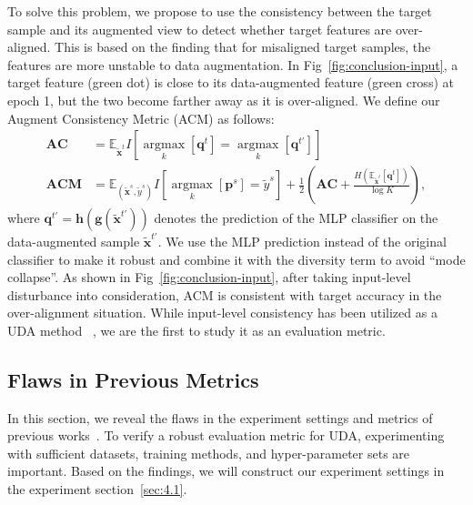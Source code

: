\documentclass{article} %
\begin{document}
To solve this problem, we propose to use the consistency between the target sample and its augmented view to detect whether target features are over-aligned. This is based on the finding that for misaligned target samples, the features are more unstable to data augmentation. In Fig~\ref{fig:conclusion-input}, a target feature (green dot) is close to its data-augmented feature (green cross) at epoch 1, but the two become farther away as it is over-aligned. We define our Augment Consistency Metric (ACM) as follows:
\begin{align}
    \boldsymbol{AC}
	&= \mathbb{E}_{\tilde{\boldsymbol{x}}^t} I[\underset{k}{\operatorname{argmax}}[\boldsymbol{q}^t]= \underset{k}{\operatorname{argmax}}[\boldsymbol{q}^{t \prime}]] \\
	\boldsymbol{ACM} &= \mathbb{E}_{(\tilde{\boldsymbol{x}}^s,\tilde y^s)} I[\underset{k}{\operatorname{argmax}}[\boldsymbol{p}^s] = \tilde y^s]+\frac{1}{2}(\boldsymbol{AC} + \frac{H(\mathbb{E}_{\tilde{\boldsymbol{x}}^t}[\boldsymbol{q}^t])}{\log K}),
\end{align}
where $\boldsymbol{q}^{t \prime}=\textbf{h}(\textbf{g}(\tilde{\boldsymbol{x}}^{t \prime}))$ denotes the prediction of the MLP classifier on the data-augmented sample $\tilde{\boldsymbol{x}}^{t \prime}$. We use the MLP prediction instead of the original classifier to make it robust and combine it with the diversity term to avoid ``mode collapse''. As shown in Fig~\ref{fig:conclusion-input}, after taking input-level disturbance into consideration, ACM is consistent with target accuracy in the over-alignment situation. While input-level consistency has been utilized as a UDA method ~\cite{Selfensembling}, we are the first to study it as an evaluation metric.

\subsection{Flaws in Previous Metrics}
\label{sec:3.4}
In this section, we reveal the flaws in the experiment settings and metrics of previous works~\cite{DEV, SND}. To verify a robust evaluation metric for UDA, experimenting with sufficient datasets, training methods, and hyper-parameter sets are important. Based on the findings, we will construct our experiment settings in the experiment section~\ref{sec:4.1}.
\end{document}
